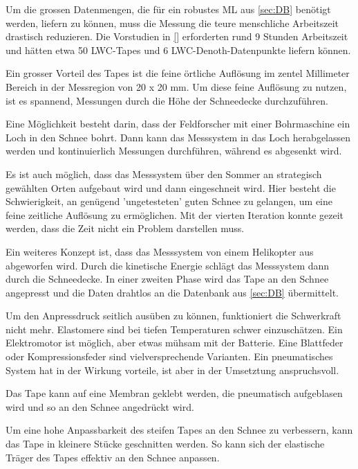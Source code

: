 Um die grossen Datenmengen, die für ein robustes ML aus \ref{sec:DB} benötigt werden, liefern zu können, muss die Messung die teure menschliche Arbeitszeit drastisch reduzieren. Die Vorstudien in \ref{} erforderten rund 9 Stunden Arbeitszeit und hätten etwa 50 LWC-Tapes und 6 LWC-Denoth-Datenpunkte liefern können.

Ein grosser Vorteil des Tapes ist die feine örtliche Auflösung im zentel Millimeter Bereich in der Messregion von 20 x 20 mm. Um diese feine Auflösung zu nutzen, ist es spannend, Messungen durch die Höhe der Schneedecke durchzuführen.


Eine Möglichkeit besteht darin, dass der Feldforscher mit einer Bohrmaschine ein Loch in den Schnee bohrt. Dann kann das Messsystem in das Loch herabgelassen werden und kontinuierlich Messungen durchführen, während es abgesenkt wird.

Es ist auch möglich, dass das Messsystem über den Sommer an strategisch gewählten Orten aufgebaut wird und dann eingeschneit wird. Hier besteht die Schwierigkeit, an genügend 'ungetesteten' guten Schnee zu gelangen, um eine feine zeitliche Auflösung zu ermöglichen. Mit der vierten Iteration konnte gezeit werden, dass die Zeit nicht ein Problem darstellen muss.


Ein weiteres Konzept ist, dass das Messsystem von einem Helikopter aus abgeworfen wird. Durch die kinetische Energie schlägt das Messsystem dann durch die Schneedecke. In einer zweiten Phase wird das Tape an den Schnee angepresst und die Daten drahtlos an die Datenbank aus \ref{sec:DB} übermittelt.

Um den Anpressdruck seitlich ausüben zu können, funktioniert die Schwerkraft nicht mehr. Elastomere sind bei tiefen Temperaturen schwer einzuschätzen. Ein Elektromotor ist möglich, aber etwas mühsam mit der Batterie. Eine Blattfeder oder Kompressionsfeder sind vielversprechende Varianten. Ein pneumatisches System hat in der Wirkung vorteile, ist aber in der Umsetztung anspruchsvoll.

Das Tape kann auf eine Membran geklebt werden, die pneumatisch aufgeblasen wird und so an den Schnee angedrückt wird.

Um eine hohe Anpassbarkeit des steifen Tapes an den Schnee zu verbessern, kann das Tape in kleinere Stücke geschnitten werden. So kann sich der elastische Träger des Tapes effektiv an den Schnee anpassen.


